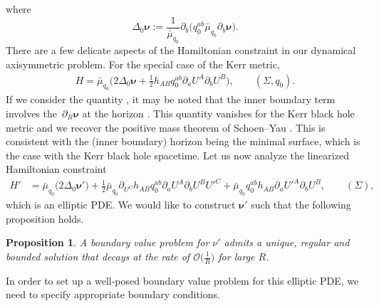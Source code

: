 \documentclass[11pt]{article}
\numberwithin{equation}{section}
\def\ptl{\partial}%
\def\mbo#1{\boldsymbol{#1}}%
\def\halb{\frac{1}{2}}%
\numberwithin{equation}{section}
\newtheorem{Proposition}[Theorem]{Proposition}
\begin{document}
where
\[
\Delta_0 \mbo{\nu} := \frac{1}{\bar{\mu}_{q_0}} \ptl_b\bigl(q^{ab}_0 \bar{\mu}_{q_0} \ptl_b \mbo{\nu}\bigr).
\]
There are a few delicate aspects of the Hamiltonian constraint in our dynamical axisymmetric problem. For the special case of the Kerr metric,
\begin{align*}
H = \bar{\mu}_{q_0} \biggl(2 \Delta_0 \mbo{\nu} + \halb h_{AB} q_0^{ab} \ptl_a U^A \ptl_b U^B\biggr), \qquad (\Sigma, q_0).
\end{align*}
If we consider the quantity , it may be noted that the inner boundary term involves the~$\ptl_R \mbo{\nu}$ at the horizon . This quantity vanishes for the Kerr black hole metric and we recover the positive mass theorem of Schoen--Yau \cite{schoen-yau-1, schoen-yau-2}. This is consistent with the (inner boundary) horizon being the minimal surface, which is the case with the Kerr black hole spacetime.
Let us now analyze the linearized Hamiltonian constraint
\begin{align*}
H' &{}= \bar{\mu}_{q_0} \bigl(2 \Delta_0 \mbo{\nu}'\bigr) + \halb \bar{\mu}_{q_0} \ptl_{U^C} h_{AB} q_0^{ab} \ptl_a U^A \ptl_b U^B U'^C + \bar{\mu}_{q_0} q_0^{ab} h_{AB} \ptl_a U'^A \ptl_b U^B, \qquad (\Sigma),
\end{align*}
which is an elliptic PDE.
We would like to construct $\mbo{\nu}'$ such that the following proposition holds.

\begin{Proposition} \label{well-posedness-nu'}
	A boundary value problem for $\nu'$ admits a unique, regular and bounded solution that decays at the rate of $\mathcal{O}\bigl(\frac{1}{R}\bigr)$ for large $R$.
\end{Proposition}

In order to set up a well-posed boundary value problem for this elliptic PDE, we need to specify appropriate boundary conditions.
\end{document}
